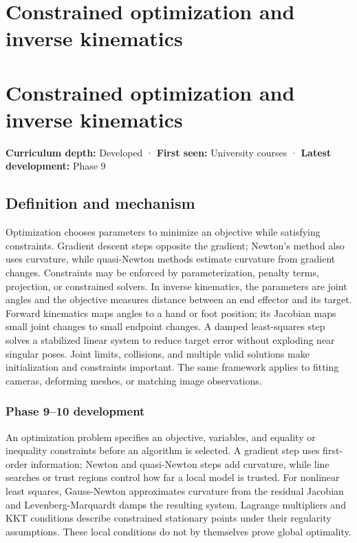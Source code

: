 \hypertarget{appendix-29f4bea4c2bb}{}
\section*{Constrained optimization and inverse kinematics}
\section{Constrained optimization and inverse kinematics}\label{constrained-optimization-and-inverse-kinematics}

\textbf{Curriculum depth:} Developed · \textbf{First seen:} University courses · \textbf{Latest development:} Phase 9

\subsection{Definition and mechanism}\label{definition-and-mechanism}

Optimization chooses parameters to minimize an objective while satisfying constraints. Gradient descent steps opposite the gradient; Newton's method also uses curvature, while quasi-Newton methods estimate curvature from gradient changes. Constraints may be enforced by parameterization, penalty terms, projection, or constrained solvers. In inverse kinematics, the parameters are joint angles and the objective measures distance between an end effector and its target. Forward kinematics maps angles to a hand or foot position; its Jacobian maps small joint changes to small endpoint changes. A damped least-squares step solves a stabilized linear system to reduce target error without exploding near singular poses. Joint limits, collisions, and multiple valid solutions make initialization and constraints important. The same framework applies to fitting cameras, deforming meshes, or matching image observations.

\subsubsection{Phase 9--10 development}\label{phase-910-development}

An optimization problem specifies an objective, variables, and equality or inequality constraints before an algorithm is selected. A gradient step uses first-order information; Newton and quasi-Newton steps add curvature, while line searches or trust regions control how far a local model is trusted. For nonlinear least squares, Gauss-Newton approximates curvature from the residual Jacobian and Levenberg-Marquardt damps the resulting system. Lagrange multipliers and KKT conditions describe constrained stationary points under their regularity assumptions. These local conditions do not by themselves prove global optimality.

